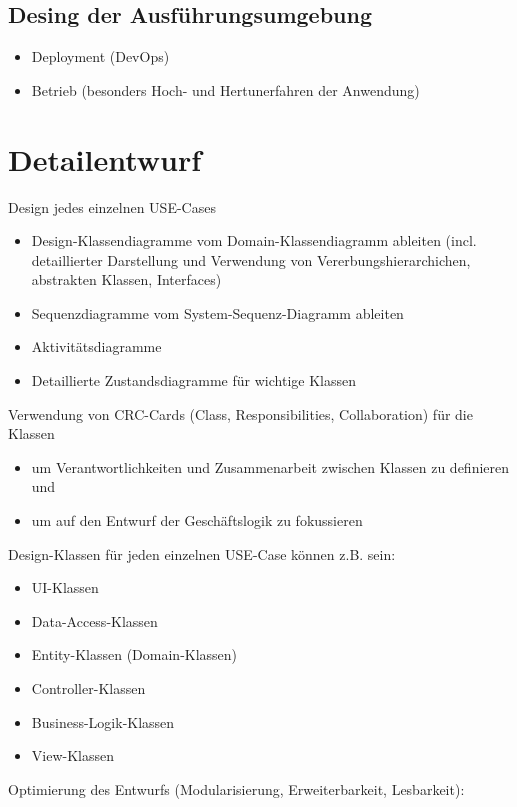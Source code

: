 \subsection{Desing der Ausführungsumgebung}
\begin{itemize}
	\item Deployment (DevOps)
	\item Betrieb (besonders Hoch- und Hertunerfahren der Anwendung)
\end{itemize}

\section{Detailentwurf}

Design jedes einzelnen USE-Cases

\begin{itemize}
	\item Design-Klassendiagramme vom Domain-Klassendiagramm ableiten (incl. detaillierter Darstellung und Verwendung von Vererbungshierarchichen, abstrakten Klassen, Interfaces)
	\item Sequenzdiagramme vom System-Sequenz-Diagramm ableiten
	\item Aktivitätsdiagramme
	\item Detaillierte Zustandsdiagramme für wichtige Klassen
\end{itemize}

Verwendung von CRC-Cards (Class, Responsibilities, Collaboration) für die Klassen
\begin{itemize}
	\item um Verantwortlichkeiten und Zusammenarbeit zwischen Klassen zu definieren und
	\item um auf den Entwurf der Geschäftslogik zu fokussieren
\end{itemize}

Design-Klassen für jeden einzelnen USE-Case können z.B. sein:

\begin{itemize}
	\item UI-Klassen
	\item Data-Access-Klassen
	\item Entity-Klassen (Domain-Klassen)
	\item Controller-Klassen
	\item Business-Logik-Klassen
	\item View-Klassen
\end{itemize}

Optimierung des Entwurfs (Modularisierung, Erweiterbarkeit, Lesbarkeit):

